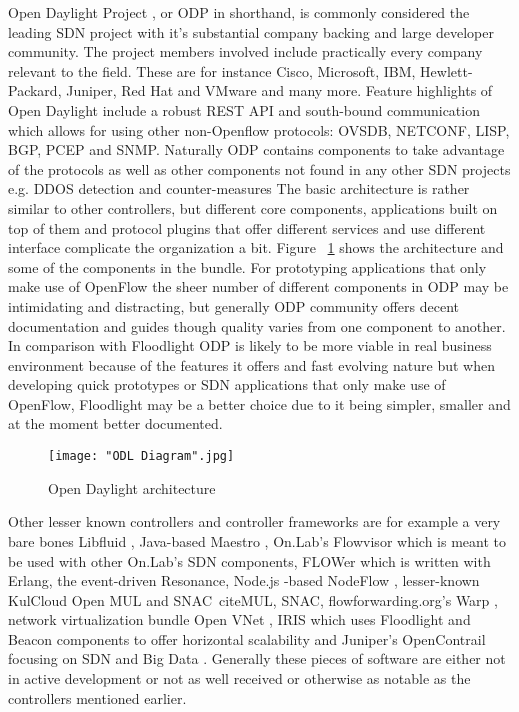 \documentclass[english]{tktltiki2}
\theoremstyle{definition}
\theoremstyle{remark}
\begin{document}
Open Daylight Project \cite{ODL}, or ODP in shorthand, is commonly considered the leading SDN project with it’s substantial company backing and large developer community. The project members involved include practically every company relevant to the field. These are for instance Cisco, Microsoft, IBM, Hewlett-Packard, Juniper, Red Hat and VMware and many more. Feature highlights of Open Daylight include  a robust REST API and south-bound communication which allows for using other non-Openflow protocols: OVSDB, NETCONF, LISP, BGP, PCEP and SNMP. Naturally ODP contains components to take advantage of the protocols as well as other components not found in any other SDN projects e.g. DDOS detection and counter-measures The basic architecture is rather similar to other controllers, but different core components, applications built on top of them and protocol plugins that offer different services and use different interface complicate the organization a bit. Figure ~\ref{fig:ODL} shows the architecture and some of the components in the bundle. For prototyping applications that only make use of OpenFlow the sheer number of different components in ODP may be intimidating and distracting, but generally ODP community offers decent documentation and guides though quality varies from one component to another. In comparison with Floodlight ODP is likely to be more viable in real business environment because of the features it offers and fast evolving nature but when developing quick prototypes or SDN applications that only make use of OpenFlow, Floodlight may be a better choice due to it being simpler, smaller and at the moment better documented.

\begin{figure}[h!t]
\centering
{}
\texttt{[image: "ODL Diagram".jpg]}
\caption{Open Daylight architecture}
\label{fig:ODL}
\end{figure}

Other lesser known controllers and controller frameworks are for example a very bare bones Libfluid \cite{Libfluid}, Java-based Maestro \cite{Maestro}, On.Lab’s Flowvisor \cite{FlowVisor} which is meant to be used with other On.Lab’s SDN components, FLOWer \cite{Flower} which is written with Erlang, the event-driven Resonance\cite{Resonance}, Node.js -based NodeFlow \cite{Nodeflow}, lesser-known KulCloud Open MUL and SNAC\ cite{MUL, SNAC}, flowforwarding.org’s Warp \cite{Warp}, network virtualization bundle Open VNet \cite{VNet}, IRIS which uses Floodlight and Beacon components to offer horizontal scalability \cite{IRIS} and Juniper’s OpenContrail focusing on SDN and Big Data \cite{Contrail}. Generally these pieces of software are either not in active development or not as well received or otherwise as notable as the controllers mentioned earlier.
\end{document}
